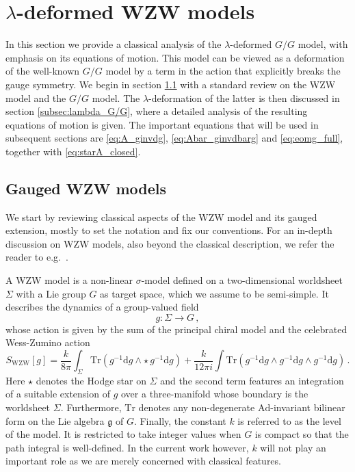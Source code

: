 \documentclass[11pt,a4paper]{article}
\numberwithin{equation}{section}
\numberwithin{table}{section}\setlength{\multlinegap}{25pt}
\newcommand{\dd}{\mathrm{d}}
\begin{document}
\section{$\lambda$-deformed WZW models}
\label{sec:lambda_WZW}

In this section we provide a classical analysis of the $\lambda$-deformed $G/G$ model, with emphasis on its equations of motion. This model can be viewed as a deformation of the well-known $G/G$ model by a term in the action that explicitly breaks the gauge symmetry. We begin in section \ref{subsec:gWZW} with a standard review on the WZW model and the $G/G$ model. The $\lambda$-deformation of the latter is then discussed in section \ref{subsec:lambda_G/G}, where a detailed analysis of the resulting equations of motion is given. The important equations that will be used in subsequent sections are \eqref{eq:A_ginvdg}, \eqref{eq:Abar_ginvdbarg} and \eqref{eq:eomg_full}, together with \eqref{eq:starA_closed}. 

\subsection{Gauged WZW models}
\label{subsec:gWZW}

We start by reviewing classical aspects of the WZW model and its gauged extension, mostly to set the notation and fix our conventions. For an in-depth discussion on WZW models, also beyond the classical description, we refer the reader to e.g.~\cite{Gawedzki_1999}.

A WZW model is a non-linear $\sigma$-model defined on a two-dimensional worldsheet $\Sigma$ with a Lie group $G$ as target space, which we assume to be semi-simple. It describes the dynamics of a group-valued field 
\begin{equation}
	g: \Sigma\rightarrow G\,,
\end{equation}
whose action is given by the sum of the principal chiral model and the celebrated Wess-Zumino action  \cite{Wess:1971,Witten:1983_current_algebra,Witten:1983_bosonization}
\begin{equation}
\label{eq:WZW_action}
	S_{\mathrm{WZW}}[g]= \frac{k}{8\pi} \int_\Sigma \mathrm{Tr}\left(g^{-1}\dd g\wedge\star\, g^{-1}\dd g \right) + \frac{k}{12\pi i}\int \mathrm{Tr}\left(g^{-1}\dd g\wedge g^{-1}\dd g\wedge g^{-1}\dd g  \right)\,.
\end{equation}
Here $\star$ denotes the Hodge star on $\Sigma$ and the second term features an integration of a suitable extension of $g$ over a three-manifold whose boundary is the worldsheet $\Sigma$. Furthermore, $\mathrm{Tr}$ denotes any non-degenerate $\mathrm{Ad}$-invariant bilinear form on the Lie algebra $\mathfrak{g}$ of $G$. Finally, the constant $k$ is referred to as the level of the model. It is restricted to take integer values when $G$ is compact so that the path integral is well-defined. In the current work however, $k$ will not play an important role as we are merely concerned with classical features. 
\end{document}
